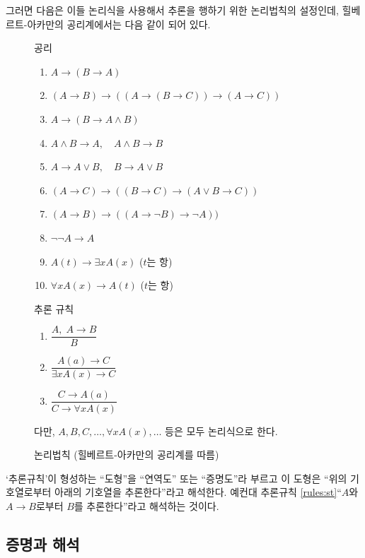 \documentclass[demo,chapter,openany,amsmath,gremph]{oblivoir}
\begin{document}
그러면 다음은 이들 논리식을 사용해서 추론을 행하기 위한 논리법칙의
설정인데, 힐베르트-아카만의 공리계에서는 다음 \과 같이
되어 있다.

\begin{figure}
\centering
\begin{minipage}{.85\textwidth}\small
\noindent\textsf{공리}\\
\begin{enumerate}[(1)]\tightlist
\item $A \to (B\to A)$
\item $(A\to B)\to ((A\to (B\to C))\to (A\to C))$
\item $A\to (B\to A\land B)$
\item $A\land B\to A,\quad A\land B\to B$
\item $A\to A\lor B,\quad B\to A\lor B$
\item $(A\to C)\to ((B\to C)\to(A\lor B\to C))$
\item $(A\to B)\to ((A\to \lnot B)\to \lnot A))$
\item $\lnot\lnot A\to A$
\item $A(t)\to \exists xA(x)$ ($t$는 항)
\item $\forall xA(x) \to A(t)$ ($t$는 항)
\end{enumerate}

\bigskip

\noindent\textsf{추론 규칙}\\
\begin{enumerate}[1~~]
\item \label{rules:st} $\dfrac{A,\; A\to B}{B}$
\item $\dfrac{A(a)\to C}{\exists xA(x)\to C}$
\item $\dfrac{C\to A(a)}{C\to \forall xA(x)}$
\end{enumerate}
다만, $A, B, C, \ldots, \forall xA(x), \ldots$ 등은 모두 논리식으로
한다.
\end{minipage}
\caption{논리법칙 (힐베르트-아카만의 공리계를 따름)}\label{fig:rules}
\end{figure}

`추론규칙'이 형성하는 ``도형''을 ``연역도'' 또는 ``증명도''라 부르고
이 도형은 ``위의 기호열로부터 아래의 기호열을 추론한다''라고
해석한다. 예컨대 추론규칙 \ref{rules:st}\는 ``$A$와 $A\to B$로부터
$B$를 추론한다''라고 해석하는 것이다.

\subsection{증명과 해석}
\end{document}
